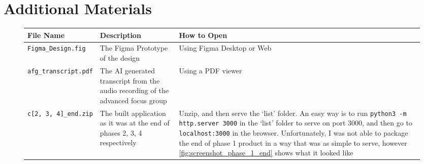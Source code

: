 \chapter{Additional Materials}
\label{appx:additional_mats}
\begin{figure}[h]
    \centering
    \begin{tabular}{|m{4cm}|p{5cm}|>{\raggedright\arraybackslash}p{5.5cm}|}
        \hline \textbf{File Name} & \textbf{Description} & \textbf{How to Open} \\ \hline
        \verb|Figma_Design.fig| & The Figma Prototype of the design & Using Figma Desktop or Web\\ \hline
        \verb|afg_transcript.pdf| & The AI generated transcript from the audio recording of the advanced focus group & Using a PDF viewer\\ \hline
        \verb|c[2, 3, 4]_end.zip| & The built application as it was at the end of phases 2, 3, 4 respectively & Unzip, and then serve the `list' folder. \newline An easy way is to run \verb|python3 -m http.server 3000| in the `list' folder to serve on port 3000, and then go to \verb|localhost:3000| in the browser. Unfortunately, I was not able to package the end of phase 1 product in a way that was as simple to serve, however \ref{fig:screenshot_phase_1_end} shows what it looked like\\ \hline
    \end{tabular}
\end{figure}
